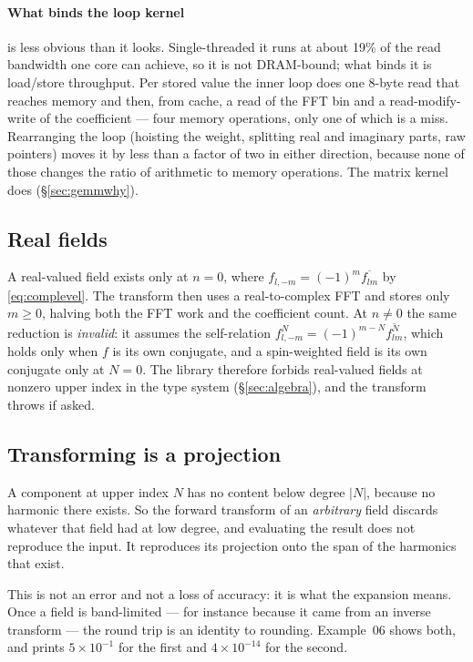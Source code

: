 \documentclass[11pt,a4paper]{article}
\newcommand{\conj}[1]{\overline{#1}}
\begin{document}
\paragraph{What binds the loop kernel} is less obvious than it looks.
Single-threaded it runs at about 19\% of the read bandwidth one core can
achieve, so it is not DRAM-bound; what binds it is load/store throughput.
Per stored value the inner loop does one 8-byte read that reaches memory
and then, from cache, a read of the FFT bin and a read-modify-write of the
coefficient --- four memory operations, only one of which is a miss.
Rearranging the loop (hoisting the weight, splitting real and imaginary
parts, raw pointers) moves it by less than a factor of two in either
direction, because none of those changes the ratio of arithmetic to memory
operations.  The matrix kernel does (\S\ref{sec:gemmwhy}).

\subsection{Real fields}

A real-valued field exists only at $n=0$, where $f_{l,-m} = (-1)^m
\conj{f_{lm}}$ by \eqref{eq:complevel}.  The transform then uses a
real-to-complex FFT and stores only $m\geq 0$, halving both the FFT work
and the coefficient count.  At $n\neq 0$ the same reduction is
\emph{invalid}: it assumes the self-relation $f^N_{l,-m}=(-1)^{m-N}
\conj{f^N_{lm}}$, which holds only when $f$ is its own conjugate, and a
spin-weighted field is its own conjugate only at $N=0$.  The library
therefore forbids real-valued fields at nonzero upper index in the type
system (\S\ref{sec:algebra}), and the transform throws if asked.

\subsection{Transforming is a projection}
\label{sec:projection}

A component at upper index $N$ has no content below degree $|N|$, because
no harmonic there exists.  So the forward transform of an \emph{arbitrary}
field discards whatever that field had at low degree, and evaluating the
result does not reproduce the input.  It reproduces its projection onto
the span of the harmonics that exist.

This is not an error and not a loss of accuracy: it is what the expansion
means.  Once a field is band-limited --- for instance because it came from
an inverse transform --- the round trip is an identity to rounding.
Example~06 shows both, and prints $5\times10^{-1}$ for the first and
$4\times10^{-14}$ for the second.
\end{document}
